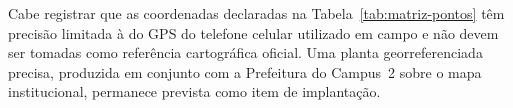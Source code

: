 Cabe registrar que as coordenadas declaradas na Tabela~\ref{tab:matriz-pontos} têm precisão limitada à do GPS do telefone celular utilizado em campo e não devem ser tomadas como referência cartográfica oficial. Uma planta georreferenciada precisa, produzida em conjunto com a Prefeitura do Campus~2 sobre o mapa institucional, permanece prevista como item de implantação.

